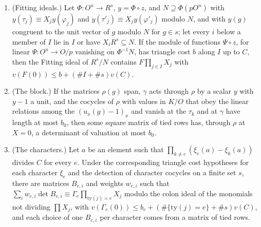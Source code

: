 \begin{proposition}\label{prop:tied-rows}
\begin{enumerate}[label=\textup{(\alph*)}]
\item (Fitting ideals.) Let $\Phi\colon O^n\to R^s$, $y=\Phi\circ z$, and $N\supseteq\Phi(pO^n)$ with $y(\tau_j)\equiv X_jy(\varphi_j)$ and $y(\tau'_j)\equiv X_jy(\varphi'_j)$ modulo $N$, and with $y(g)$ congruent to the unit vector of $g$ modulo $N$ for $g\in s$; let every
$i$ below a member of $I$ lie in $I$ or have $X_iR^s\subseteq N$. If the module of functions $\Psi\circ z$, for linear
$\Psi\colon O^n\to O/p$ vanishing on $\Phi^{-1}N$, has triangle cost $b$ along $I$ up to $C$, then the Fitting ideal of $R^s/N$ contains $F\prod_{j\in I}X_j$ with $v(F(0))\le b+(\#I+\#s)v(C)$.
\item (The block.) If the matrices $\rho(g)$ span, $\gamma$ acts through $\rho$ by a scalar $y$ with $y-1$ a unit, and the cocycles of $\rho$ with values in $K/O$ that obey the linear relations among the $(u_x(g)-1)_x$ and vanish
at the $\tau_k$ and at $\gamma$ have length at most $b_0$, then some square matrix of tied rows has, through $\rho$ at $X=0$, a determinant of valuation at most $b_0$.
\item (The characters.) Let $a$ be an element such that $\prod_{k\ne e}(\xi_e(a)-\xi_k(a))$ divides $C$ for every $e$. Under the corresponding triangle cost hypotheses for each
character $\xi_e$ and the detection of character cocycles on a finite set $s$, there are matrices $B_{e,i}$ and weights $w_{e,i}$ such that
$\sum_iw_{e,i}\det B_{e,i}\equiv\Gamma_e\prod_{\mathrm{ty}(j)=e}X_j$ modulo the colon ideal of the monomials not dividing $\prod X_j$, with $v(\Gamma_e(0))\le b_e+(\#\{\mathrm{ty}(j)=e\}+\#s)v(C)$, and each choice of one $B_{e,i}$ per character comes from a
matrix of tied rows.
\end{enumerate}
\end{proposition}

